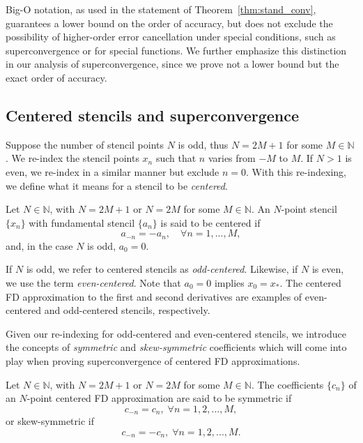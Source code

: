 \documentclass[12pt]{article}
\newcommand{\N}{\mathbb{N}}
\newcommand{\xstar}{x_*}
\begin{document}
%
\begin{remark}
Big-O notation, as used in the statement of Theorem~\ref{thm:stand_conv}, guarantees a lower bound on the order of accuracy, but does not exclude the possibility of higher-order error cancellation under special conditions, such as superconvergence or for special functions.
We further emphasize this distinction in our analysis of superconvergence, since we prove not a lower bound but the exact order of accuracy.
\end{remark}


\subsection{Centered stencils and superconvergence}

Suppose the number of stencil points $N$ is odd, thus $N=2M+1$ for some $M\in\N$.
We re-index the stencil points $x_n$ such that $n$ varies from $-M$ to $M$.
If $N>1$ is even, we re-index in a similar manner but exclude $n=0$.
With this re-indexing, we define what it means for a stencil to be \textit{centered}.

%
\begin{definition}\label{def:cent_sten}
Let $N\in\N$, with $N=2M+1$ or $N=2M$ for some $M\in\N$. 
An $N$-point stencil $\{x_n\}$ with fundamental stencil $\{a_n\}$ is said to be {centered} if 
\[
	a_{-n} = -a_n, \quad \forall n=1,...,M,
\]
and, in the case $N$ is odd, $a_0=0$.
\end{definition}

If $N$ is odd, we refer to centered stencils as \textit{odd-centered}.
Likewise, if $N$ is even, we use the term \textit{even-centered}.
Note that $a_0=0$ implies $x_0=\xstar$.
The centered FD approximation to the first and second derivatives are examples of even-centered and odd-centered stencils, respectively.

Given our re-indexing for odd-centered and even-centered stencils, we introduce the concepts of \textit{symmetric} and \textit{skew-symmetric} coefficients which will come into play when proving superconvergence of centered FD approximations.

%
\begin{definition}\label{def:symm_coeff}
Let $N\in\N$, with $N=2M+1$ or $N=2M$ for some $M\in\N$.
The coefficients $\{c_n\}$ of an $N$-point centered FD approximation are said to be {symmetric} if 
\[
	c_{-n} = c_n, \;\forall n=1,2,...,M,
\]
or {skew-symmetric} if
\[
	c_{-n}=-c_n, \; \forall n=1,2,...,M.
\]
\end{definition}
\end{document}
